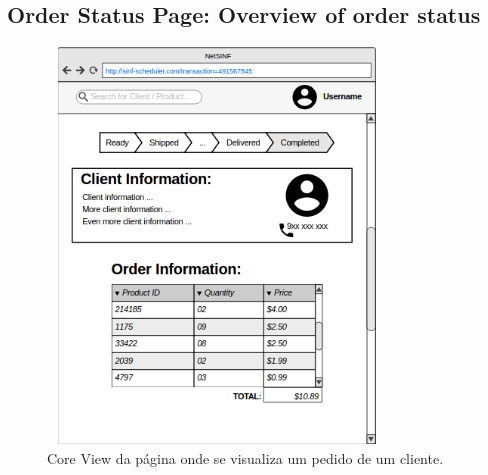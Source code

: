 \begin{titlepage}
\subsection{Order Status Page: Overview of order status}

\begin{figure}[H]
  \centering
    \includegraphics[width=9cm, height = 10.5cm]{SINF_orderpage.png}
  \caption{Core View da página onde se visualiza um pedido de um cliente.}
  \label{uml}
\end{figure}


\end{titlepage}
